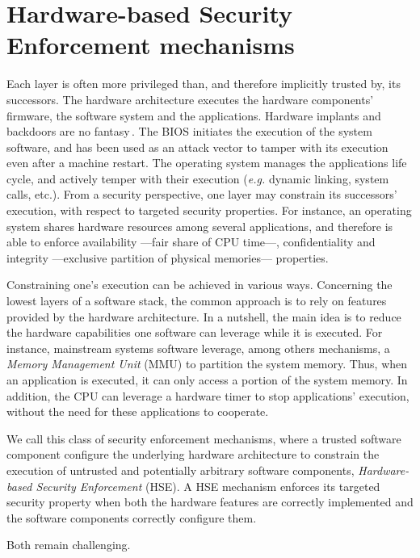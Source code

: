 \section{Hardware-based Security Enforcement mechanisms}

Each layer is often more privileged than, and therefore implicitly trusted by,
its successors.
%
The hardware architecture executes the hardware components' firmware, the
software system and the applications.
%
Hardware implants and backdoors are no fantasy\,\cite{yang2016a2}.
%
The BIOS initiates the execution of the system software, and has been used as an
attack vector to tamper with its execution even after a machine restart.
%
The operating system manages the applications life cycle, and actively temper
with their execution (\emph{e.g.} dynamic linking, system calls, etc.).
%
From a security perspective, one layer may constrain its successors' execution,
with respect to targeted security properties.
%
For instance, an operating system shares hardware resources among several
applications, and therefore is able to enforce availability ---fair share of CPU
time---, confidentiality and integrity ---exclusive partition of physical
memories--- properties.

Constraining one's execution can be achieved in various ways.
%
Concerning the lowest layers of a software stack, the common approach is to rely
on features provided by the hardware architecture.
%
In a nutshell, the main idea is to reduce the hardware capabilities one software
can leverage while it is executed.
%
For instance, mainstream systems software leverage, among others mechanisms, a
\emph{Memory Management Unit} (MMU) to partition the system memory.
%
Thus, when an application is executed, it can only access a portion of the
system memory.
%
In addition, the CPU can leverage a hardware timer to stop applications'
execution, without the need for these applications to cooperate.

We call this class of security enforcement mechanisms, where a trusted software
component configure the underlying hardware architecture to constrain the
execution of untrusted and potentially arbitrary software components,
\emph{Hardware-based Security Enforcement} (HSE).
%
A HSE mechanism enforces its targeted security property when both the hardware
features are correctly implemented and the software components correctly
configure them.

Both remain challenging.


